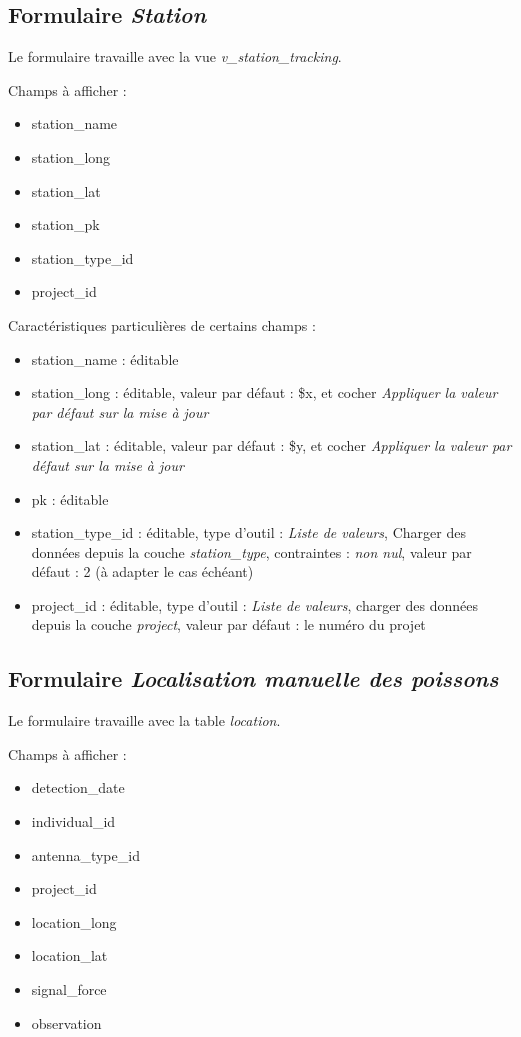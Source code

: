 \subsection{Formulaire \textit{Station}}

Le formulaire travaille avec la vue \textit{v\_station\_tracking}.

Champs à afficher :
\begin{itemize}
	\item station\_name
	\item station\_long
	\item station\_lat
	\item station\_pk
	\item station\_type\_id
	\item project\_id
\end{itemize}

Caractéristiques particulières de certains champs :
\begin{itemize}
	\item station\_name : éditable
	\item station\_long : éditable, valeur par défaut : \$x, et cocher \textit{Appliquer la valeur par défaut sur la mise à jour}
	\item station\_lat : éditable, valeur par défaut : \$y, et cocher \textit{Appliquer la valeur par défaut sur la mise à jour}
	\item pk : éditable
	\item station\_type\_id : éditable, type d'outil : \textit{Liste de valeurs}, Charger des données depuis la couche \textit{station\_type}, contraintes : \textit{non nul}, valeur par défaut : 2 (à adapter le cas échéant)
	\item project\_id : éditable, type d'outil : \textit{Liste de valeurs}, charger des données depuis la couche \textit{project}, valeur par défaut : le numéro du projet
\end{itemize}

\subsection{Formulaire \textit{Localisation manuelle des poissons}}

Le formulaire travaille avec la table \textit{location}. 

Champs à afficher : 
\begin{itemize}
	\item detection\_date
	\item individual\_id
	\item antenna\_type\_id
	\item project\_id
	\item location\_long
	\item location\_lat
	\item signal\_force
	\item observation
\end{itemize}

